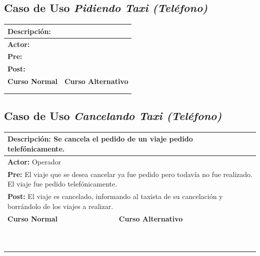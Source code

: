 \documentclass[a4paper]{article}
\begin{document}
\subsection{Caso de Uso \textit{Pidiendo Taxi (Tel\'efono)}}
\begin{center}
\begin{tabular}{|p{8cm} | p{8cm}|}
\hline
\multicolumn{2}{|p{16cm}|}{\textbf{Descripci\'on:} } \\
\hline
\multicolumn{2}{|l|}{\textbf{Actor:} } \\
\hline
\multicolumn{2}{|l|}{\textbf{Pre:} } \\
\hline
\multicolumn{2}{|p{14cm}|}{\textbf{Post:} }\\
\hline
\textbf{Curso Normal}  & \textbf{Curso Alternativo} \\ \hline

 & \\ \hline
 & \\ \hline
\end{tabular}
\end{center}

\subsection{Caso de Uso \textit{Cancelando Taxi (Tel\'efono)}}
\begin{center}
\begin{tabular}{|p{8cm} | p{8cm}|}
\hline
\multicolumn{2}{|p{15cm}|}{\textbf{Descripci\'on:} Se cancela el pedido de un viaje pedido telef\'onicamente.} \\
\hline
\multicolumn{2}{|p{15cm}|}{\textbf{Actor:} Operador} \\
\hline
\multicolumn{2}{|p{15cm}|}{\textbf{Pre:} El viaje que se desea cancelar ya fue pedido pero todav\'ia no fue realizado. El viaje fue pedido telef\'onicamente.} \\
\hline
\multicolumn{2}{|p{14cm}|}{\textbf{Post:} El viaje es cancelado, informando al taxista de su cancelaci\'on y borr\'andolo de los viajes a realizar.}\\
\hline
\textbf{Curso Normal}  & \textbf{Curso Alternativo} \\ \hline
 & \\ \hline
 & \\ \hline
 & \\ \hline
 & \\ \hline
 & \\ \hline
 & \\ \hline
 & \\ \hline
 & \\ \hline
 & \\ \hline
 & \\ \hline
\end{tabular}
\end{center}
\end{document}
